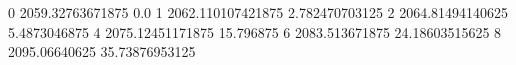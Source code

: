0 2059.32763671875 0.0
1 2062.110107421875 2.782470703125
2 2064.81494140625 5.4873046875
4 2075.12451171875 15.796875
6 2083.513671875 24.18603515625
8 2095.06640625 35.73876953125
